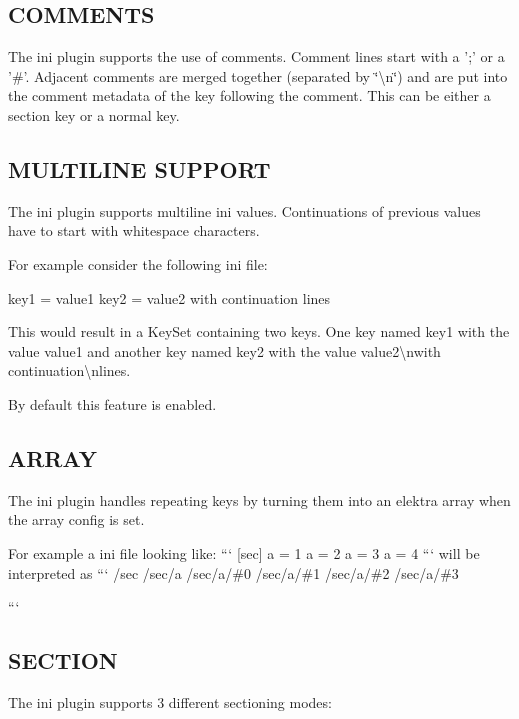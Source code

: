 \subsection*{C\+O\+M\+M\+E\+N\+T\+S}

The ini plugin supports the use of comments. Comment lines start with a ';' or a '\#'. Adjacent comments are merged together (separated by \char`\"{}\textbackslash{}n\char`\"{}) and are put into the comment metadata of the key following the comment. This can be either a section key or a normal key.

\subsection*{M\+U\+L\+T\+I\+L\+I\+N\+E S\+U\+P\+P\+O\+R\+T}

The ini plugin supports multiline ini values. Continuations of previous values have to start with whitespace characters.

For example consider the following ini file\+: \begin{DoxyVerb}            key1 = value1
            key2 = value2
                with continuation
                lines
\end{DoxyVerb}


This would result in a Key\+Set containing two keys. One key named {\ttfamily key1} with the value {\ttfamily value1} and another key named {\ttfamily key2} with the value {\ttfamily value2\textbackslash{}nwith continuation\textbackslash{}nlines}.

By default this feature is enabled.

\subsection*{A\+R\+R\+A\+Y}

The ini plugin handles repeating keys by turning them into an elektra array when the {\ttfamily array} config is set.

For example a ini file looking like\+: ``` \mbox{[}sec\mbox{]} a = 1 a = 2 a = 3 a = 4 ``` will be interpreted as ``` /sec /sec/a /sec/a/\#0 /sec/a/\#1 /sec/a/\#2 /sec/a/\#3

```

\subsection*{S\+E\+C\+T\+I\+O\+N}

The ini plugin supports 3 different sectioning modes\+:


